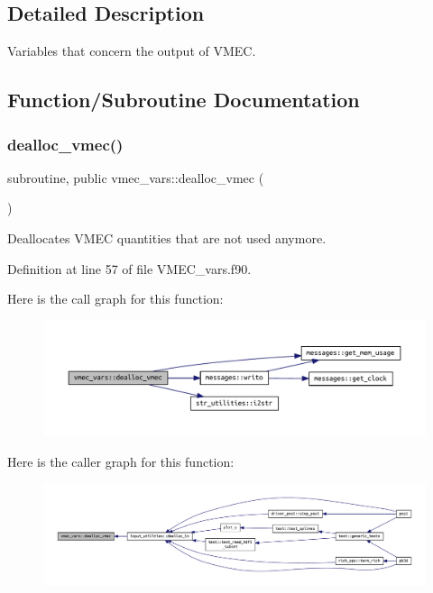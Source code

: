 \subsection{Detailed Description}
Variables that concern the output of V\+M\+EC. 

\subsection{Function/\+Subroutine Documentation}
\mbox{\label{namespacevmec__vars_afe14ec328664d93b93c6dbda69df9175}} 
\subsubsection{\texorpdfstring{dealloc\+\_\+vmec()}{dealloc\_vmec()}}
{\footnotesize\ttfamily subroutine, public vmec\+\_\+vars\+::dealloc\+\_\+vmec (\begin{DoxyParamCaption}{ }\end{DoxyParamCaption})}



Deallocates V\+M\+EC quantities that are not used anymore. 



Definition at line 57 of file V\+M\+E\+C\+\_\+vars.\+f90.

Here is the call graph for this function\+:\nopagebreak
\begin{figure}[H]
\begin{center}
\leavevmode
\includegraphics[width=350pt]{namespacevmec__vars_afe14ec328664d93b93c6dbda69df9175_cgraph}
\end{center}
\end{figure}
Here is the caller graph for this function\+:\nopagebreak
\begin{figure}[H]
\begin{center}
\leavevmode
\includegraphics[width=350pt]{namespacevmec__vars_afe14ec328664d93b93c6dbda69df9175_icgraph}
\end{center}
\end{figure}


